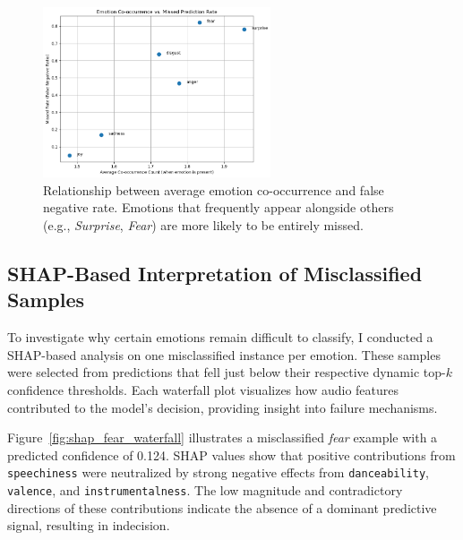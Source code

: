 \documentclass{article}
\begin{document}
\begin{figure}[H]
\centering
\includegraphics[width=0.6\textwidth]{Graphics/Error Analysis/Emotion Co vs Missed Prediction Rate.png}
\caption{Relationship between average emotion co-occurrence and false negative rate. Emotions that frequently appear alongside others (e.g., \textit{Surprise}, \textit{Fear}) are more likely to be entirely missed.}
\label{fig:cooccur_missrate}
\end{figure}

\subsection{SHAP-Based Interpretation of Misclassified Samples}

To investigate why certain emotions remain difficult to classify, I conducted a SHAP-based analysis on one misclassified instance per emotion. These samples were selected from predictions that fell just below their respective dynamic top-$k$ confidence thresholds. Each waterfall plot visualizes how audio features contributed to the model's decision, providing insight into failure mechanisms.

Figure~\ref{fig:shap_fear_waterfall} illustrates a misclassified \textit{fear} example with a predicted confidence of 0.124. SHAP values show that positive contributions from \texttt{speechiness} were neutralized by strong negative effects from \texttt{danceability}, \texttt{valence}, and \texttt{instrumentalness}. The low magnitude and contradictory directions of these contributions indicate the absence of a dominant predictive signal, resulting in indecision.
\end{document}

